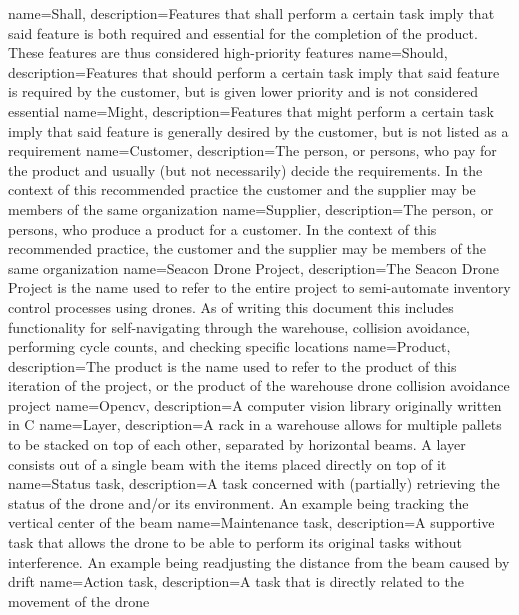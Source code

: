 {
	name={Shall},
	description={Features that shall perform a certain task imply that said feature is both required and essential for the completion of the product. These features are thus considered high-priority features}
}
{
	name={Should},
	description={Features that should perform a certain task imply that said feature is required by the customer, but is given lower priority and is not considered essential}
}
{
	name={Might},
	description={Features that might perform a certain task imply that said feature is generally desired by the customer, but is not listed as a requirement}
}
{
	name={Customer},
	description={The person, or persons, who pay for the product and usually (but not necessarily) decide the requirements. In the context of this recommended practice the customer and the supplier may be members of the same organization}
}
{
	name={Supplier},
	description={The person, or persons, who produce a product for a customer. In the context of this recommended practice, the customer and the supplier may be members of the same organization}
}
{
	name={Seacon Drone Project},
	description={The Seacon Drone Project is the name used to refer to the entire project to semi-automate inventory control processes using drones. As of writing this document this includes functionality for self-navigating through the warehouse, collision avoidance, performing cycle counts, and checking specific locations}
}
{
	name={Product},
	description={The product is the name used to refer to the product of this iteration of the project, or the product of the warehouse drone collision avoidance project}
}
{
	name={Opencv},
	description={A computer vision library originally written in C}
}
{
	name={Layer},
	description={A rack in a warehouse allows for multiple pallets to be stacked on top of each other, separated by horizontal beams. A layer consists out of a single beam with the items placed directly on top of it}
}
{
	name={Status task},
	description={A task concerned with (partially) retrieving the status of the drone and/or its environment. An example being tracking the vertical center of the beam}
}
{
	name={Maintenance task},
	description={A supportive task that allows the drone to be able to perform its original tasks without interference. An example being readjusting the distance from the beam caused by drift}
}
{
	name={Action task},
	description={A task that is directly related to the movement of the drone}
}





